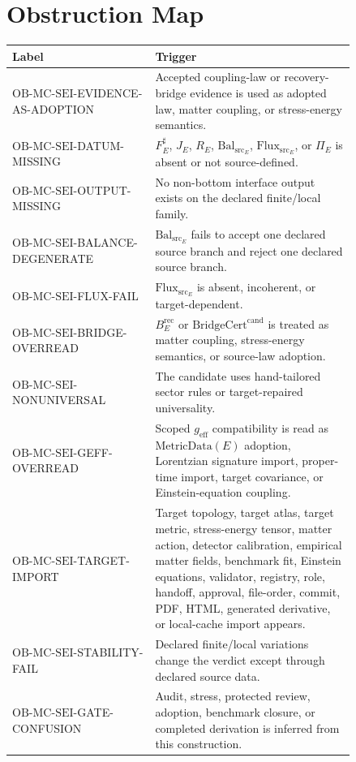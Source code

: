 \documentclass[11pt]{article}
\newcommand{\MetricData}{\mathrm{MetricData}}
\newcommand{\geff}{g_{\mathrm{eff}}}
\newcommand{\BridgeCertCand}{\mathrm{BridgeCert}^{\mathrm{cand}}}
\newcommand{\BErec}{B_E^{\mathrm{rec}}}
\newcommand{\BalSrc}{\mathrm{Bal}_{\mathrm{src}}}
\newcommand{\FluxSrc}{\mathrm{Flux}_{\mathrm{src}}}
\newcommand{\OBMCSEI}{\mathrm{OB}\mbox{-}\mathrm{MC}\mbox{-}\mathrm{SEI}}
\begin{document}
\section{Obstruction Map}

\begin{longtable}{p{0.35\linewidth}p{0.49\linewidth}}
\toprule
Label & Trigger \\
\midrule
\(\OBMCSEI\)-EVIDENCE-AS-ADOPTION &
Accepted coupling-law or recovery-bridge evidence is used as adopted law,
matter coupling, or stress-energy semantics. \\
\(\OBMCSEI\)-DATUM-MISSING &
\(F_E^\sharp\), \(J_E\), \(R_E\), \(\BalSrc_E\), \(\FluxSrc_E\), or
\(\Pi_E\) is absent or not source-defined. \\
\(\OBMCSEI\)-OUTPUT-MISSING &
No non-bottom interface output exists on the declared finite/local family. \\
\(\OBMCSEI\)-BALANCE-DEGENERATE &
\(\BalSrc_E\) fails to accept one declared source branch and reject one
declared source branch. \\
\(\OBMCSEI\)-FLUX-FAIL &
\(\FluxSrc_E\) is absent, incoherent, or target-dependent. \\
\(\OBMCSEI\)-BRIDGE-OVERREAD &
\(\BErec\) or \(\BridgeCertCand\) is treated as matter coupling,
stress-energy semantics, or source-law adoption. \\
\(\OBMCSEI\)-NONUNIVERSAL &
The candidate uses hand-tailored sector rules or target-repaired
universality. \\
\(\OBMCSEI\)-GEFF-OVERREAD &
Scoped \(\geff\) compatibility is read as \(\MetricData(E)\) adoption,
Lorentzian signature import, proper-time import, target covariance, or
Einstein-equation coupling. \\
\(\OBMCSEI\)-TARGET-IMPORT &
Target topology, target atlas, target metric, stress-energy tensor, matter
action, detector calibration, empirical matter fields, benchmark fit,
Einstein equations, validator, registry, role, handoff, approval, file-order,
commit, PDF, HTML, generated derivative, or local-cache import appears. \\
\(\OBMCSEI\)-STABILITY-FAIL &
Declared finite/local variations change the verdict except through declared
source data. \\
\(\OBMCSEI\)-GATE-CONFUSION &
Audit, stress, protected review, adoption, benchmark closure, or completed
derivation is inferred from this construction. \\
\bottomrule
\end{longtable}
\end{document}
